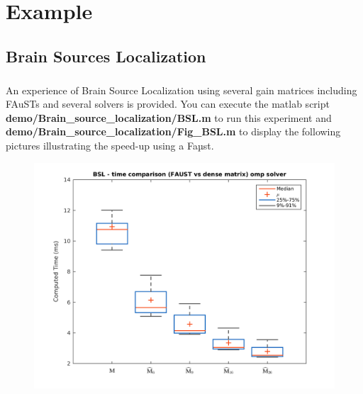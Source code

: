 \chapter{Example}\label{sec:example}

\section{Brain Sources Localization}\label{sec:BSL_example}
%



\paragraph{} An experience of Brain Source Localization using several gain matrices including FAuSTs and several solvers is provided. You can execute the matlab script \textbf{demo/Brain\_source\_localization/BSL.m} to run this experiment and \textbf{demo/Brain\_source\_localization/Fig\_BSL.m} to display the following pictures illustrating the speed-up using a Faµst.

\begin{figure}[!htbp]
\label{fig:BSL}
\includegraphics[scale=0.8]{images/BSL.png}
\end{figure}

